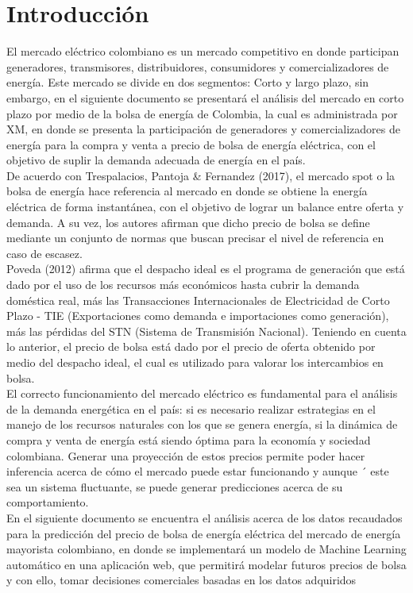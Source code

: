 \documentclass[conference, 10pt]{IEEEtran}
\begin{document}
\section{Introducción}
El mercado eléctrico colombiano es un mercado competitivo en donde participan generadores, transmisores, distribuidores, consumidores y comercializadores de energía. Este mercado se divide en dos segmentos: Corto y largo plazo, sin embargo, en el siguiente documento se presentará el análisis del mercado en corto plazo por medio de la bolsa de energía de Colombia, la cual es administrada por XM, en donde se presenta la participación de generadores y comercializadores de energía para la compra y venta a precio de bolsa de energía eléctrica, con el objetivo de suplir la demanda adecuada de energía en el país.\\
De acuerdo con Trespalacios, Pantoja \& Fernandez (2017)\cite{b5}, el mercado spot o la bolsa de energía hace referencia al mercado en donde se obtiene la energía eléctrica de forma instantánea, con el objetivo de lograr un balance entre oferta  y demanda. A su vez, los autores afirman que dicho precio de bolsa se define mediante un conjunto de normas que buscan precisar el nivel de referencia en caso de escasez.\\
Poveda (2012) \cite{b1} afirma que el despacho ideal es el programa de generación que está dado por el uso de los recursos más económicos hasta cubrir la demanda doméstica real, más las Transacciones Internacionales de Electricidad de Corto Plazo - TIE (Exportaciones como demanda e importaciones como generación), más las pérdidas del STN (Sistema de Transmisión Nacional). Teniendo en cuenta lo anterior, el precio de bolsa está dado por el precio de oferta obtenido por medio del despacho ideal, el cual es utilizado para valorar los intercambios en bolsa.\\
El correcto funcionamiento del mercado eléctrico es fundamental para el análisis de la demanda energética en el país: si es necesario realizar estrategias en el manejo de los recursos naturales con los que se genera energía, si la dinámica de compra y venta de energía está siendo óptima para la economía y sociedad colombiana. Generar una proyección de estos precios permite poder hacer inferencia acerca de cómo el mercado puede estar funcionando y aunque ´ este sea un sistema fluctuante, se puede generar predicciones acerca de su comportamiento.\\

En el siguiente documento se encuentra el análisis acerca de los datos recaudados para la predicción del precio de bolsa de energía eléctrica del mercado de energía mayorista colombiano, en donde se implementará un modelo de Machine Learning automático en una aplicación web, que permitirá modelar futuros precios de bolsa y con ello, tomar decisiones comerciales basadas en los datos adquiridos
\end{document}
